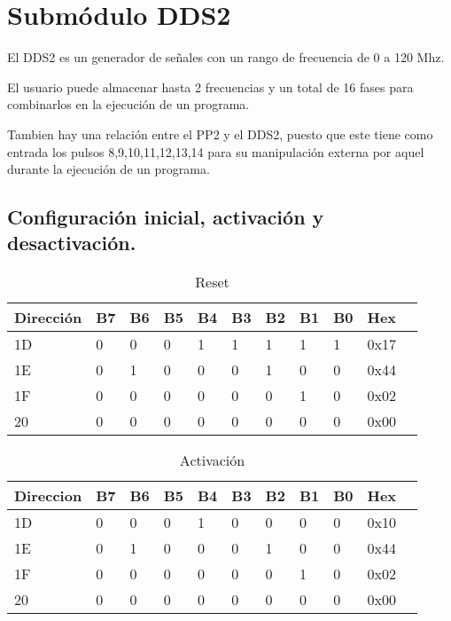 \section{Subm\'odulo DDS2}

El DDS2 es un generador de se\~nales con un rango de frecuencia de 0 a 120 Mhz.

El usuario puede almacenar hasta 2 frecuencias y un total de 16 fases para 
combinarlos en la ejecuci\'on de un programa.

Tambien hay una relaci\'on entre el PP2 y el DDS2, puesto que este tiene como entrada
los pulsos 8,9,10,11,12,13,14 para su manipulaci\'on externa por aquel durante
la ejecuci\'on de un programa.

\subsection{Configuraci\'on inicial, activaci\'on y desactivaci\'on.}

\begin{table}[ht]
    \centering
    \begin{tabular}{|l|l|l|l|l|l|l|l|l|l|l|}
    \hline
    Direcci\'on  &B7 & B6 & B5 & B4& B3 & B2& B1 & B0 &Hex\\
    \hline
    1D  &0 & 0 & 0 & 1& 1 & 1& 1 & 1 &0x17\\
    \hline
    1E  &0 & 1 & 0 & 0& 0 & 1& 0 & 0 &0x44\\
    \hline
    1F  &0 & 0 & 0 & 0& 0 & 0& 1 & 0 & 0x02\\
    \hline
    20  &0 & 0 & 0 & 0 & 0 & 0& 0 & 0&0x00 \\
    \hline
    \end{tabular}
    \caption{\label{tab:dds2_config_inicial}Reset}
    \end{table}

    \begin{table}[ht]
    \centering
    \begin{tabular}{|l|l|l|l|l|l|l|l|l|l|l|}
    \hline
    Direccion  &B7 & B6 & B5 & B4& B3 & B2& B1 & B0 &Hex\\
    \hline
    1D  &0 & 0 & 0 & 1& 0 & 0& 0 & 0 &0x10\\
    \hline
    1E  &0 & 1 & 0 & 0& 0 & 1& 0 & 0 &0x44\\
    \hline
    1F  &0 & 0 & 0 & 0& 0 & 0& 1 & 0 & 0x02\\
    \hline
    20  &0 & 0 & 0 & 0 & 0 & 0& 0 & 0&0x00 \\
    \hline
    \end{tabular}
    \caption{\label{tab:dds2_activate}Activaci\'on}
    \end{table}
    
